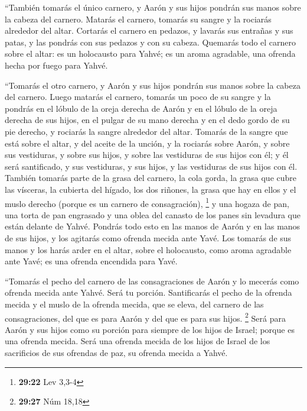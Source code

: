  ``También tomarás el único carnero, y Aarón y sus hijos
pondrán sus manos sobre la cabeza del carnero.  Matarás
el carnero, tomarás su sangre y la rociarás alrededor del altar.
 Cortarás el carnero en pedazos, y lavarás sus entrañas y
sus patas, y las pondrás con sus pedazos y con su cabeza.
 Quemarás todo el carnero sobre el altar: es un
holocausto para Yahvé; es un aroma agradable, una ofrenda hecha por
fuego para Yahvé.

 ``Tomarás el otro carnero, y Aarón y sus hijos pondrán
sus manos sobre la cabeza del carnero.  Luego matarás el
carnero, tomarás un poco de su sangre y la pondrás en el lóbulo de la
oreja derecha de Aarón y en el lóbulo de la oreja derecha de sus hijos,
en el pulgar de su mano derecha y en el dedo gordo de su pie derecho, y
rociarás la sangre alrededor del altar.  Tomarás de la
sangre que está sobre el altar, y del aceite de la unción, y la rociarás
sobre Aarón, y sobre sus vestiduras, y sobre sus hijos, y sobre las
vestiduras de sus hijos con él; y él será santificado, y sus vestiduras,
y sus hijos, y las vestiduras de sus hijos con él. 
También tomarás parte de la grasa del carnero, la cola gorda, la grasa
que cubre las vísceras, la cubierta del hígado, los dos riñones, la
grasa que hay en ellos y el muslo derecho (porque es un carnero de
consagración), \footnote{\textbf{29:22} Lev 3,3-4}  y una
hogaza de pan, una torta de pan engrasado y una oblea del canasto de los
panes sin levadura que están delante de Yahvé.  Pondrás
todo esto en las manos de Aarón y en las manos de sus hijos, y los
agitarás como ofrenda mecida ante Yavé.  Los tomarás de
sus manos y los harás arder en el altar, sobre el holocausto, como aroma
agradable ante Yavé; es una ofrenda encendida para Yavé.

 ``Tomarás el pecho del carnero de las consagraciones de
Aarón y lo mecerás como ofrenda mecida ante Yahvé. Será tu porción.
 Santificarás el pecho de la ofrenda mecida y el muslo de
la ofrenda mecida, que se eleva, del carnero de las consagraciones, del
que es para Aarón y del que es para sus hijos. \footnote{\textbf{29:27}
  Núm 18,18}  Será para Aarón y sus hijos como su porción
para siempre de los hijos de Israel; porque es una ofrenda mecida. Será
una ofrenda mecida de los hijos de Israel de los sacrificios de sus
ofrendas de paz, su ofrenda mecida a Yahvé.

